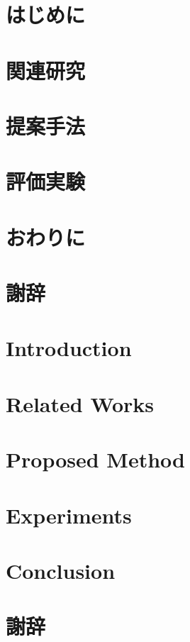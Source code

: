 \usepackage{my-tex-presets/mytexutils}

\section{はじめに}\label{sec:i}


\section{関連研究}\label{sec:r}


\section{提案手法}\label{sec:pm}


\section{評価実験}\label{sec:e}


\section{おわりに}\label{sec:c}


\section*{謝辞}


\section{Introduction}\label{sec:i}


\section{Related Works}\label{sec:r}


\section{Proposed Method}\label{sec:pm}


\section{Experiments}\label{sec:e}


\section{Conclusion}\label{sec:c}


\section*{謝辞}






